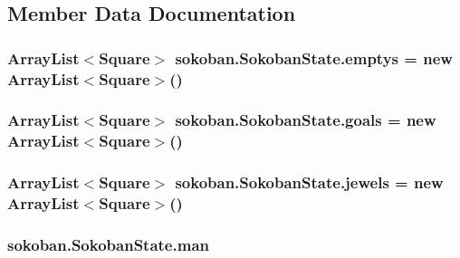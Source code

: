 \subsection{Member Data Documentation}
\hypertarget{classsokoban_1_1SokobanState_fccb278bd378b05c43629c11b1de98c4}{
\subsubsection[{emptys}]{\setlength{\rightskip}{0pt plus 5cm}ArrayList$<${\bf Square}$>$ {\bf sokoban.SokobanState.emptys} = new ArrayList$<${\bf Square}$>$()}}
\label{classsokoban_1_1SokobanState_fccb278bd378b05c43629c11b1de98c4}


\hypertarget{classsokoban_1_1SokobanState_5b927bad859e4dfb75c47b81332025f7}{
\subsubsection[{goals}]{\setlength{\rightskip}{0pt plus 5cm}ArrayList$<${\bf Square}$>$ {\bf sokoban.SokobanState.goals} = new ArrayList$<${\bf Square}$>$()}}
\label{classsokoban_1_1SokobanState_5b927bad859e4dfb75c47b81332025f7}


\hypertarget{classsokoban_1_1SokobanState_c99af6c76d7bb97a3f9a4cb99941b191}{
\subsubsection[{jewels}]{\setlength{\rightskip}{0pt plus 5cm}ArrayList$<${\bf Square}$>$ {\bf sokoban.SokobanState.jewels} = new ArrayList$<${\bf Square}$>$()}}
\label{classsokoban_1_1SokobanState_c99af6c76d7bb97a3f9a4cb99941b191}


\hypertarget{classsokoban_1_1SokobanState_64bdc705128d80106207c569ee46d2e7}{
\subsubsection[{man}]{ {\bf sokoban.SokobanState.man}}}
\label{classsokoban_1_1SokobanState_64bdc705128d80106207c569ee46d2e7}


